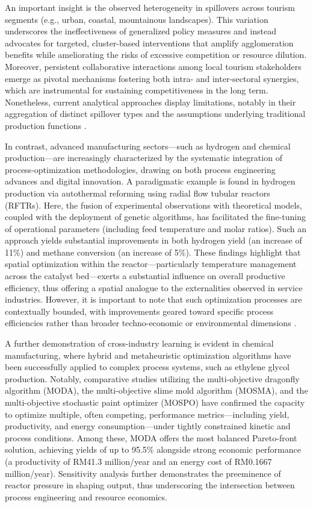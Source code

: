 \documentclass[sigconf]{acmart}
\begin{document}
An important insight is the observed heterogeneity in spillovers across tourism segments (e.g., urban, coastal, mountainous landscapes). This variation underscores the ineffectiveness of generalized policy measures and instead advocates for targeted, cluster-based interventions that amplify agglomeration benefits while ameliorating the risks of excessive competition or resource dilution. Moreover, persistent collaborative interactions among local tourism stakeholders emerge as pivotal mechanisms fostering both intra- and inter-sectoral synergies, which are instrumental for sustaining competitiveness in the long term. Nonetheless, current analytical approaches display limitations, notably in their aggregation of distinct spillover types and the assumptions underlying traditional production functions \cite{ref88}.

In contrast, advanced manufacturing sectors—such as hydrogen and chemical production—are increasingly characterized by the systematic integration of process-optimization methodologies, drawing on both process engineering advances and digital innovation. A paradigmatic example is found in hydrogen production via autothermal reforming using radial flow tubular reactors (RFTRs). Here, the fusion of experimental observations with theoretical models, coupled with the deployment of genetic algorithms, has facilitated the fine-tuning of operational parameters (including feed temperature and molar ratios). Such an approach yields substantial improvements in both hydrogen yield (an increase of 11\%) and methane conversion (an increase of 5\%). These findings highlight that spatial optimization within the reactor—particularly temperature management across the catalyst bed—exerts a substantial influence on overall productive efficiency, thus offering a spatial analogue to the externalities observed in service industries. However, it is important to note that such optimization processes are contextually bounded, with improvements geared toward specific process efficiencies rather than broader techno-economic or environmental dimensions \cite{ref74}.

A further demonstration of cross-industry learning is evident in chemical manufacturing, where hybrid and metaheuristic optimization algorithms have been successfully applied to complex process systems, such as ethylene glycol production. Notably, comparative studies utilizing the multi-objective dragonfly algorithm (MODA), the multi-objective slime mold algorithm (MOSMA), and the multi-objective stochastic paint optimizer (MOSPO) have confirmed the capacity to optimize multiple, often competing, performance metrics—including yield, productivity, and energy consumption—under tightly constrained kinetic and process conditions. Among these, MODA offers the most balanced Pareto-front solution, achieving yields of up to 95.5\% alongside strong economic performance (a productivity of RM41.3 million/year and an energy cost of RM0.1667 million/year). Sensitivity analysis further demonstrates the preeminence of reactor pressure in shaping output, thus underscoring the intersection between process engineering and resource economics.
\end{document}
